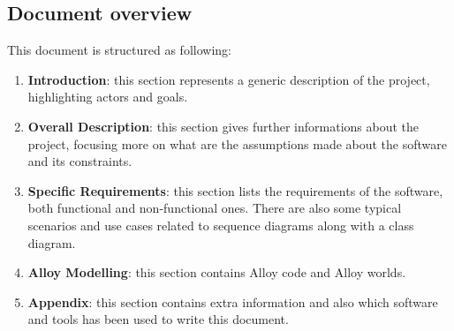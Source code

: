 \subsection{Document overview}
This document is structured as following:
\begin{enumerate}
	\item \textbf{Introduction}: this section represents a generic description of the project, highlighting actors and goals.
	\item \textbf{Overall Description}: this section gives further informations about the project, focusing more on what are the assumptions made about the software and its constraints.
	\item \textbf{Specific Requirements}: this section lists the requirements of the software, both functional and non-functional ones. There are also some typical scenarios and use cases related to sequence diagrams along with a class diagram.
	\item \textbf{Alloy Modelling}: this section contains Alloy code and Alloy worlds.
	\item \textbf{Appendix}: this section contains extra information and also which software and tools has been used to write this document.
\end{enumerate}